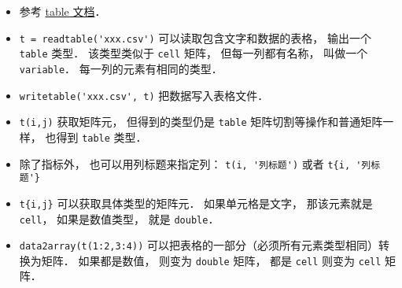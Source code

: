 
\begin{issues}
\issueDraft
\end{issues}

\begin{itemize}
\item 参考 \href{https://www.mathworks.com/help/matlab/tables.html}{table 文档}．
\item \verb|t = readtable('xxx.csv')| 可以读取包含文字和数据的表格， 输出一个 \verb|table| 类型． 该类型类似于 \verb|cell| 矩阵， 但每一列都有名称， 叫做一个 \verb|variable|． 每一列的元素有相同的类型．
\item \verb|writetable('xxx.csv', t)| 把数据写入表格文件．
\item \verb|t(i,j)| 获取矩阵元， 但得到的类型仍是 \verb|table| 矩阵切割等操作和普通矩阵一样， 也得到 \verb|table| 类型．
\item 除了指标外， 也可以用列标题来指定列： \verb|t(i, '列标题')| 或者 \verb|t{i, '列标题'}|
\item \verb|t{i,j}| 可以获取具体类型的矩阵元． 如果单元格是文字， 那该元素就是 \verb|cell|， 如果是数值类型， 就是 \verb|double|．
\item \verb|data2array(t(1:2,3:4))|  可以把表格的一部分（必须所有元素类型相同）转换为矩阵． 如果都是数值， 则变为 \verb|double| 矩阵， 都是 \verb|cell| 则变为 \verb|cell| 矩阵．
\end{itemize}
